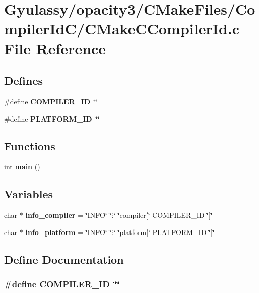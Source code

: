 \section{Gyulassy/opacity3/CMakeFiles/CompilerIdC/CMakeCCompilerId.c File Reference}
\label{CMakeCCompilerId_8c}
\subsection*{Defines}
\begin{CompactItemize}
\item 
\#define {\bf COMPILER\_\-ID}~\char`\"{}\char`\"{}
\item 
\#define {\bf PLATFORM\_\-ID}~\char`\"{}\char`\"{}
\end{CompactItemize}
\subsection*{Functions}
\begin{CompactItemize}
\item 
int {\bf main} ()
\end{CompactItemize}
\subsection*{Variables}
\begin{CompactItemize}
\item 
char $\ast$ {\bf info\_\-compiler} = \char`\"{}INFO\char`\"{} \char`\"{}:\char`\"{} \char`\"{}compiler[\char`\"{} COMPILER\_\-ID \char`\"{}]\char`\"{}
\item 
char $\ast$ {\bf info\_\-platform} = \char`\"{}INFO\char`\"{} \char`\"{}:\char`\"{} \char`\"{}platform[\char`\"{} PLATFORM\_\-ID \char`\"{}]\char`\"{}
\end{CompactItemize}


\subsection{Define Documentation}
\subsubsection{\setlength{\rightskip}{0pt plus 5cm}\#define COMPILER\_\-ID~\char`\"{}\char`\"{}}\label{CMakeCCompilerId_8c_81dee0709ded976b2e0319239f72d174}




